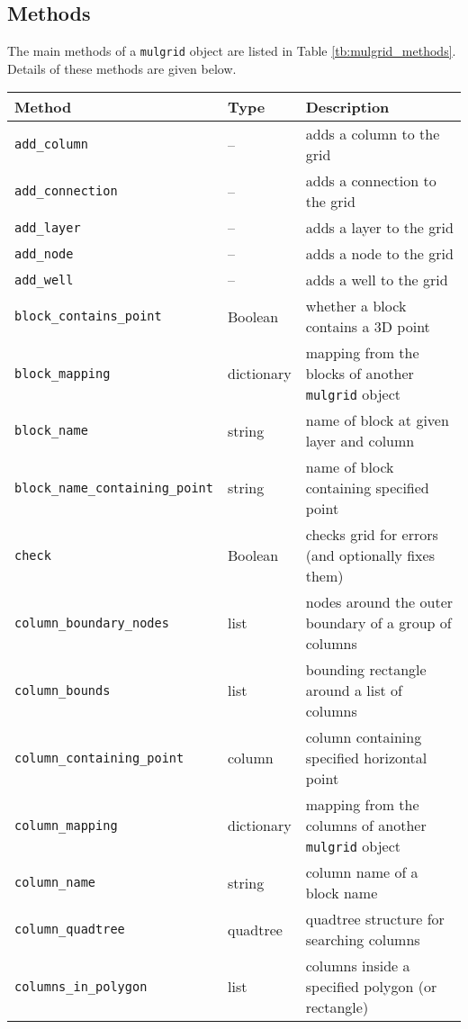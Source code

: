 \subsection{Methods}
\label{mulgridmethods}

The main methods of a \texttt{mulgrid} object are listed in Table \ref{tb:mulgrid_methods}.  Details of these methods are given below.

\begin{center}
\begin{longtable}{|l|l|p{70mm}|}
  \hline
  \textbf{Method} & \textbf{Type} & \textbf{Description}\\
  \hline
  \texttt{add\_column} & -- & adds a column to the grid\\ 
  \texttt{add\_connection} & -- & adds a connection to the grid\\ 
  \texttt{add\_layer} & -- & adds a layer to the grid\\ 
  \texttt{add\_node} & -- & adds a node to the grid\\ 
  \texttt{add\_well} & -- & adds a well to the grid\\ 
  \texttt{block\_contains\_point} & Boolean & whether a block contains a 3D point\\
  \texttt{block\_mapping} & dictionary & mapping from the blocks of another \texttt{mulgrid} object\\
  \texttt{block\_name} & string & name of block at given layer and column\\
  \texttt{block\_name\_containing\_point} & string & name of block containing specified point\\
  \texttt{check} & Boolean & checks grid for errors (and optionally fixes them)\\ 
  \texttt{column\_boundary\_nodes} & list & nodes around the outer boundary of a group of columns\\ 
  \texttt{column\_bounds} & list & bounding rectangle around a list of columns\\ 
  \texttt{column\_containing\_point} & column & column containing specified horizontal point\\ 
  \texttt{column\_mapping} & dictionary & mapping from the columns of another \texttt{mulgrid} object\\
  \texttt{column\_name} & string & column name of a block name\\ 
  \texttt{column\_quadtree} & quadtree & quadtree structure for searching columns\\ 
  \texttt{columns\_in\_polygon} & list & columns inside a specified polygon (or rectangle)\\ 

\end{longtable}
\end{center}
